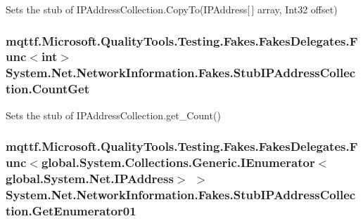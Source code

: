 Sets the stub of I\-P\-Address\-Collection.\-Copy\-To(\-I\-P\-Address\mbox{[}$\,$\mbox{]} array, Int32 offset)

\hypertarget{class_system_1_1_net_1_1_network_information_1_1_fakes_1_1_stub_i_p_address_collection_a57022128b87414e3efcefe9649e764ad}{
\subsubsection[{Count\-Get}]{\setlength{\rightskip}{0pt plus 5cm}mqttf.\-Microsoft.\-Quality\-Tools.\-Testing.\-Fakes.\-Fakes\-Delegates.\-Func$<$int$>$ System.\-Net.\-Network\-Information.\-Fakes.\-Stub\-I\-P\-Address\-Collection.\-Count\-Get}}\label{class_system_1_1_net_1_1_network_information_1_1_fakes_1_1_stub_i_p_address_collection_a57022128b87414e3efcefe9649e764ad}


Sets the stub of I\-P\-Address\-Collection.\-get\-\_\-\-Count()

\hypertarget{class_system_1_1_net_1_1_network_information_1_1_fakes_1_1_stub_i_p_address_collection_a2292a946af9eda2316a20e6c17d7f45c}{
\subsubsection[{Get\-Enumerator01}]{\setlength{\rightskip}{0pt plus 5cm}mqttf.\-Microsoft.\-Quality\-Tools.\-Testing.\-Fakes.\-Fakes\-Delegates.\-Func$<$global.\-System.\-Collections.\-Generic.\-I\-Enumerator$<$global.\-System.\-Net.\-I\-P\-Address$>$ $>$ System.\-Net.\-Network\-Information.\-Fakes.\-Stub\-I\-P\-Address\-Collection.\-Get\-Enumerator01}}\label{class_system_1_1_net_1_1_network_information_1_1_fakes_1_1_stub_i_p_address_collection_a2292a946af9eda2316a20e6c17d7f45c}



